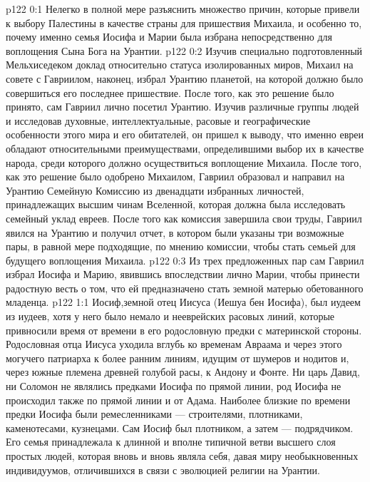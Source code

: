 \vs p122 0:1 Нелегко в полной мере разъяснить множество причин, которые привели к выбору Палестины в качестве страны для пришествия Михаила, и особенно то, почему именно семья Иосифа и Марии была избрана непосредственно для воплощения Сына Бога на Урантии.
\vs p122 0:2 Изучив специально подготовленный Мельхиседеком доклад относительно статуса изолированных миров, Михаил на совете с Гавриилом, наконец, избрал Урантию планетой, на которой должно было совершиться его последнее пришествие. После того, как это решение было принято, сам Гавриил лично посетил Урантию. Изучив различные группы людей и исследовав духовные, интеллектуальные, расовые и географические особенности этого мира и его обитателей, он пришел к выводу, что именно евреи обладают относительными преимуществами, определившими выбор их в качестве народа, среди которого должно осуществиться воплощение Михаила. После того, как это решение было одобрено Михаилом, Гавриил образовал и направил на Урантию Семейную Комиссию из двенадцати избранных личностей, принадлежащих высшим чинам Вселенной, которая должна была исследовать семейный уклад евреев. После того как комиссия завершила свои труды, Гавриил явился на Урантию и получил отчет, в котором были указаны три возможные пары, в равной мере подходящие, по мнению комиссии, чтобы стать семьей для будущего воплощения Михаила.
\vs p122 0:3 Из трех предложенных пар сам Гавриил избрал Иосифа и Марию, явившись впоследствии лично Марии, чтобы принести радостную весть о том, что ей предназначено стать земной матерью обетованного младенца.
\vs p122 1:1 Иосиф,земной отец Иисуса (Иешуа бен Иосифа), был иудеем из иудеев, хотя у него было немало и нееврейских расовых линий, которые привносили время от времени в его родословную предки с материнской стороны. Родословная отца Иисуса уходила вглубь ко временам Авраама и через этого могучего патриарха к более ранним линиям, идущим от шумеров и нодитов и, через южные племена древней голубой расы, к Андону и Фонте. Ни царь Давид, ни Соломон не являлись предками Иосифа по прямой линии, род Иосифа не происходил также по прямой линии и от Адама. Наиболее близкие по времени предки Иосифа были ремесленниками --- строителями, плотниками, каменотесами, кузнецами. Сам Иосиф был плотником, а затем --- подрядчиком. Его семья принадлежала к длинной и вполне типичной ветви высшего слоя простых людей, которая вновь и вновь являла себя, давая миру необыкновенных индивидуумов, отличившихся в связи с эволюцией религии на Урантии.

